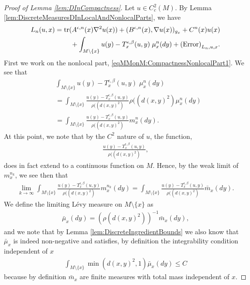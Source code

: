 \documentclass[11pt,reqno]{amsart}
\numberwithin{equation}{section}
\theoremstyle{plain}
\def\Tr{\textnormal{tr}}
\begin{document}
\begin{proof}[Proof of Lemma \ref{lem:DInCompactness}]
	
	Let $u\in C^2_c(M)$.  By Lemma \ref{lem:DiscreteMeasuresDInLocalAndNonlocalParts}, we have
	\begin{align}
	    L_n(u,x) & = \Tr(A^{\epsilon,n}(x)\nabla^2u(x))+(B^{\epsilon,n}(x),\nabla u(x))_{g_x} + C^{n}(x)u(x)\label{eqMMonM:CompactnessLocalPart1}\\
		&\ \ \ \ \ \ \  +\int_{M\setminus\{x\}}u(y)-T^{\epsilon,\beta}_x(u,y)\;\mu_x^{n}(dy)+\textnormal{(Error)}_{L_n,u,x}\label{eqMMonM:CompactnessNonlocalPart1}. 
	\end{align}  
	First we work on the nonlocal part, \eqref{eqMMonM:CompactnessNonlocalPart1}.  We see that
	\begin{align*}
		&\int_{M\setminus\{x\}}u(y)-T^{\epsilon,\beta}_x(u,y)\;\mu_x^{n}(dy)\\
		&= \int_{M\setminus\{x\}}\frac{u(y)-T^{\epsilon,\beta}_x(u,y)}{\rho((d(x,y)^2)}\rho((d(x,y)^2)\mu_x^{n}(dy)\\
		&= \int_{M\setminus\{x\}}\frac{u(y)-T^{\epsilon,\beta}_x(u,y)}{\rho((d(x,y)^2)}m_x^{n}(dy).
	\end{align*}
	At this point, we note that by the $C^2$ nature of $u$, the function,
	\begin{align*}
		\frac{u(y)-T^{\epsilon,\beta}_x(u,y)}{\rho((d(x,y)^2)},
	\end{align*}
	does in fact extend to a continuous function on $M$.  Hence, by the weak limit of $m_x^{n_k}$, we see then that
	\begin{align*}
	\lim_{k\to\infty} \int_{M\setminus\{x\}}\frac{u(y)-T^{\epsilon,\beta}_x(u,y)}{\rho((d(x,y)^2)}m_x^{n_k}(dy)
	= \int_{M\setminus\{x\}}\frac{u(y)-T^{\epsilon,\beta}_x(u,y)}{\rho((d(x,y)^2)}\bar m_x(dy).
	\end{align*}
	We define the limiting L\'evy measure on $M\setminus\{x\}$ as 
	\begin{align*}
		\bar \mu_x(dy) = (\rho(d(x,y)^2))^{-1}\bar m_x(dy),
	\end{align*}
	and we note that by Lemma \ref{lem:DiscreteIngredientBounds} we also know that $\bar \mu_x$ is indeed non-negative and satisfies, by definition the integrability condition independent of $x$
	\begin{align*}
		\int_{M\setminus \{x\} } \min(d(x,y)^2,1)\bar \mu_x(dy)\leq C
	\end{align*}
	because by definition $\bar m_x$ are finite measures with total mass independent of $x$.



\end{proof}
\end{document}
